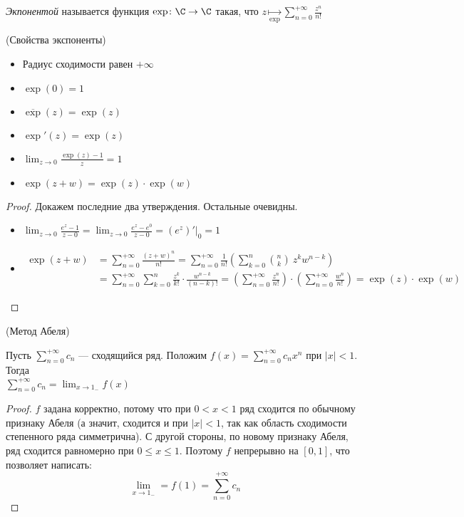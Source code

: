 \begin{definition}
    \textit{Экпонентой} называется функция $\exp \colon \C \to \C$ такая,
    что $\displaystyle z \underset{\exp}{\mapsto} \sum_{n =
    0}^{+\infty}{\frac{z^n}{n!}}$
\end{definition}

\begin{theorem}(Свойства экспоненты)

    \begin{itemize}
        \item Радиус сходимости равен $+\infty$
        \item $\exp(0) = 1$
        \item $\overline{\exp}(z) = \exp(z)$
        \item $\exp'(z) = \exp(z)$
        \item $\displaystyle \lim_{z \to 0}{\frac{\exp(z) - 1}{z}} = 1$
        \item $\exp(z + w) = \exp(z) \cdot \exp(w)$
    \end{itemize}
\end{theorem}
\begin{proof}
    Докажем последние два утверждения. Остальные очевидны.
    \begin{itemize}
        \item
$ \displaystyle
    \lim_{z \to 0}{\frac{e^z - 1}{z - 0}}
    = \lim_{z \to 0}{\frac{e^z - e^0}{z - 0}}
    = (e^z)'\bigg|_0 = 1
$
        \item
\begin{align*}
    \exp(z + w) &= \sum_{n = 0}^{+\infty}{\frac{(z + w)^n}{n!}}
    = \sum_{n = 0}^{+\infty}{\frac{1}{n!}\left(
    \sum_{k = 0}^{n}{\binom{n}{k}~z^k w^{n - k}}\right)} \\
    &= \sum_{n = 0}^{+\infty}{\sum_{k = 0}^{n}}{\frac{z^k}{k!}
    \cdot \frac{w^{n - k}}{(n - k)!}}
    = \left(\sum_{n = 0}^{+\infty}{\frac{z^n}{n!}}\right)
    \cdot \left(\sum_{n = 0}^{+\infty}{\frac{w^n}{n!}}\right)
    = \exp(z) \cdot \exp(w)
\end{align*}
    \end{itemize}
\end{proof}

\begin{theorem}(Метод Абеля)

    Пусть $\displaystyle \sum_{n = 0}^{+\infty}{c_n}$ --- сходящийся ряд.
    Положим $\displaystyle f(x) = \sum_{n = 0}^{+\infty}{c_n x^n}$ при $|x| < 
    1$. Тогда \\ $\displaystyle \sum_{n = 0}^{+\infty}{c_n} = \lim_{x \to 1_{-
    }}{f(x)}$
\end{theorem}
\begin{proof}
	$f$ задана корректно, потому что при $0 < x < 1$ ряд сходится по обычному признаку 
	Абеля (а значит, сходится и при $|x| < 1$, так как область сходимости степенного 
	ряда симметрична). С другой стороны, по новому признаку Абеля, ряд сходится 
	равномерно  при $0 \leqslant x \leqslant 1$. Поэтому $f$ непрерывно на $[0, 1]$, что
	позволяет написать:
\[
    \lim_{x \to 1_{-}} = f(1) = \sum_{n = 0}^{+\infty}{c_n}
\]
\end{proof}

